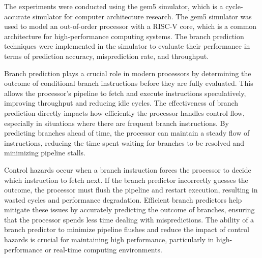 \documentclass[10pt,journal,compsoc]{IEEEtran}
\begin{document}
The experiments were conducted using the gem5 simulator, which is a cycle-accurate simulator for computer architecture research.\cite{lowepower2020gem5simulatorversion200}
The gem5 simulator was used to model an out-of-order processor with a RISC-V core, which is a common architecture for high-performance computing systems.
The branch prediction techniques were implemented in the simulator to evaluate their performance in terms of prediction accuracy, misprediction rate, and throughput.

Branch prediction plays a crucial role in modern processors by determining the outcome of conditional branch instructions before they are fully evaluated. This allows the processor's pipeline to fetch and execute instructions speculatively, improving throughput and reducing idle cycles. The effectiveness of branch prediction directly impacts how efficiently the processor handles control flow, especially in situations where there are frequent branch instructions. By predicting branches ahead of time, the processor can maintain a steady flow of instructions, reducing the time spent waiting for branches to be resolved and minimizing pipeline stalls.\cite{1003559}

Control hazards occur when a branch instruction forces the processor to decide which instruction to fetch next. If the branch predictor incorrectly guesses the outcome, the processor must flush the pipeline and restart execution, resulting in wasted cycles and performance degradation. Efficient branch predictors help mitigate these issues by accurately predicting the outcome of branches, ensuring that the processor spends less time dealing with mispredictions. The ability of a branch predictor to minimize pipeline flushes and reduce the impact of control hazards is crucial for maintaining high performance, particularly in high-performance or real-time computing environments.\cite{matsuiEfficientImplementationTAGE2019,calderFastAccurateInstruction1994a,choudhuryOptimizedRISCVProcessor2022,heSurveyComparisonPipeline2023a,emmaCharacterizationBranchData1987a}
\end{document}
